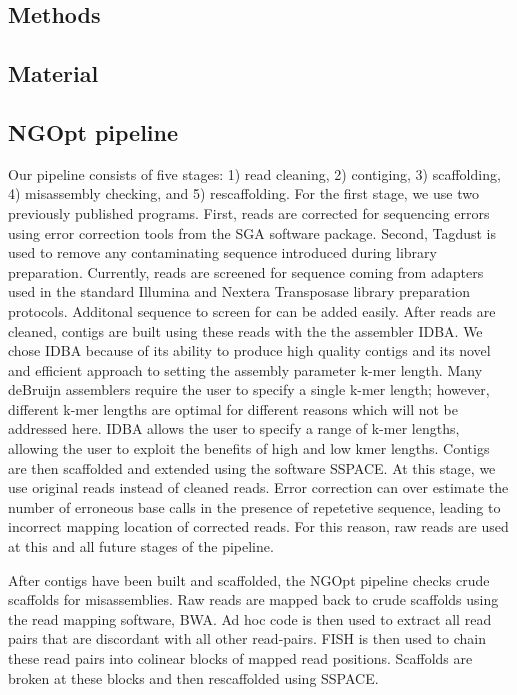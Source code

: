 \documentclass{bioinfo}
\begin{document}
\begin{methods}
\section{Methods}
\subsection{Material}
\subsection{NGOpt pipeline}

Our pipeline consists of five stages: 1) read cleaning, 2) contiging, 3) scaffolding,
4) misassembly checking, and 5) rescaffolding. For the first stage, we use two previously
published programs. First, reads are corrected for sequencing errors using error correction tools 
from the SGA software package. Second, Tagdust is used to remove any contaminating sequence introduced
during library preparation. Currently, reads are screened for sequence coming from adapters
used in the standard Illumina and Nextera Transposase library preparation protocols. Additonal 
sequence to screen for can be added easily. After reads are cleaned, contigs are built
using these reads with the the assembler IDBA. We chose IDBA because of its ability to produce 
high quality contigs and its novel and efficient approach to setting the assembly parameter k-mer length. 
Many deBruijn assemblers require the user to specify a single k-mer length; however, different k-mer
lengths are optimal for different reasons which will not be addressed here. IDBA allows the user to specify
a range of k-mer lengths, allowing the user to exploit the benefits of high and low kmer lengths.
Contigs are then scaffolded and extended using the software SSPACE. At this stage, we use original reads
instead of cleaned reads. Error correction can over estimate the number of erroneous base calls in 
the presence of repetetive sequence, leading to incorrect mapping location of corrected reads. 
For this reason, raw reads are used at this and all future stages of the pipeline. 

After contigs have been built and scaffolded, the NGOpt pipeline checks crude scaffolds for 
misassemblies. Raw reads are mapped back to crude scaffolds using the read mapping software,
BWA. Ad hoc code is then used to extract all read pairs that are discordant with all other
read-pairs. FISH is then used to chain these read pairs into colinear blocks of mapped read positions. 
Scaffolds are broken at these blocks and then rescaffolded using SSPACE.


\end{methods}
\end{document}
